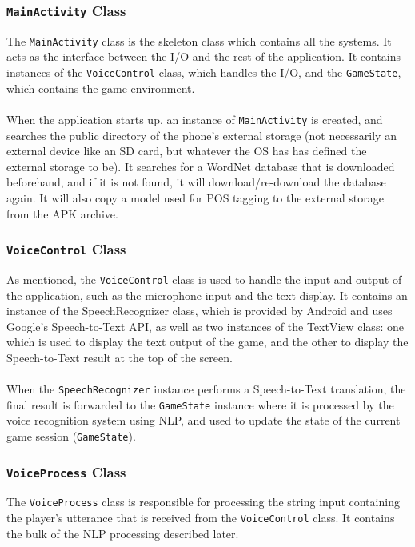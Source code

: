 \documentclass[11pt]{article}
\begin{document}
\subsubsection{\texttt{MainActivity} Class}

The \texttt{MainActivity} class is the skeleton class which contains all the systems. It acts as the interface between the I/O and the rest of the application. It contains instances of the \texttt{VoiceControl} class, which handles the I/O, and the \texttt{GameState}, which contains the game environment.
\\
\\
When the application starts up, an instance of \texttt{MainActivity} is created, and searches the public directory of the phone's external storage (not necessarily an external device like an SD card, but whatever the OS has has defined the external storage to be). It searches for a WordNet database that is downloaded beforehand, and if it is not found, it will download/re-download the database again. It will also copy a model used for POS tagging to the external storage from the APK archive.

\subsubsection{\texttt{VoiceControl} Class}

As mentioned, the \texttt{VoiceControl} class is used to handle the input and output of the application, such as the microphone input and the text display. It contains an instance of the SpeechRecognizer class, which is provided by Android and uses Google's Speech-to-Text API, as well as two instances of the TextView class: one which is used to display the text output of the game, and the other to display the Speech-to-Text result at the top of the screen.
\\
\\
When the \texttt{SpeechRecognizer} instance performs a Speech-to-Text translation, the final result is forwarded to the \texttt{GameState} instance where it is processed by the voice recognition system using NLP, and used to update the state of the current game session (\texttt{GameState}).

\subsubsection{\texttt{VoiceProcess} Class}

The \texttt{VoiceProcess} class is responsible for processing the string input containing the player's utterance that is received from the \texttt{VoiceControl} class. It contains the bulk of the NLP processing described later.
\end{document}
